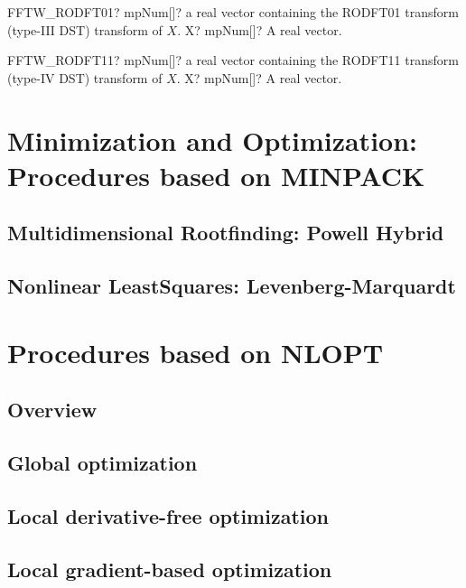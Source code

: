 \documentclass[12pt,a4paper,openany]{book}
\begin{document}
\begin{mpFunctionsExtract}
\mpFunctionOne
{FFTW\_RODFT01? mpNum[]? a real vector containing the RODFT01 transform (type-III DST) transform of $X$.}
{X? mpNum[]? A real vector.}
\end{mpFunctionsExtract}

\begin{mpFunctionsExtract}
\mpFunctionOne
{FFTW\_RODFT11? mpNum[]? a real vector containing the RODFT11 transform (type-IV DST) transform of $X$.}
{X? mpNum[]? A real vector.}
\end{mpFunctionsExtract}

\chapter{Minimization and Optimization: Procedures based on MINPACK}

\section{Multidimensional Rootfinding: Powell Hybrid}

\section{Nonlinear LeastSquares: Levenberg-Marquardt }

\chapter{Procedures based on NLOPT}

\section{Overview}

\section{Global optimization}

\section{Local derivative-free optimization}

\section{Local gradient-based optimization}
\end{document}
